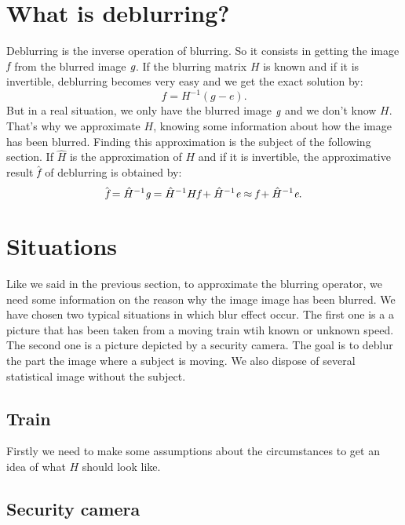 
\section{What is deblurring?} 

Deblurring is the inverse operation of blurring. So it consists in getting the image $\emph{f}$ from the blurred image $\emph{g}$. If the blurring matrix $H$ is known and if it is invertible, deblurring becomes very easy and we get the exact solution by:
\begin{equation}
f=H^{-1}(g-e).
\end{equation}
But in a real situation, we only have the blurred image $\emph{g}$ and we don't know $H$. That's why we approximate $H$, knowing some information about how the image has been blurred. Finding this approximation is the subject of the following section. If $\hat{H}$ is the approximation of $H$ and if it is invertible, the approximative result $\hat{\emph{f}}$ of deblurring is obtained by:
\begin{equation}
\hat{\emph{f}} = \hat{H}^{-1} \emph{g} = \hat{H}^{-1}H\emph{f} + \hat{H}^{-1}\emph{e} \approx \emph{f} + \hat{H}^{-1}\emph{e}.
\end{equation}

\section{Situations}

Like we said in the previous section, to approximate the blurring operator, we need some information on the reason why the image image has been blurred. We have chosen two typical situations in which blur effect occur. The first one is a a picture that has been taken from a moving train wtih known or unknown speed. The second one is a picture depicted by a security camera. The goal is to deblur the part the image where a subject is moving. We also dispose of several statistical image without the subject.

\subsection{Train}

Firstly we need to make some assumptions about the circumstances to get an idea of what $H$ should look like.

\subsection{Security camera}
